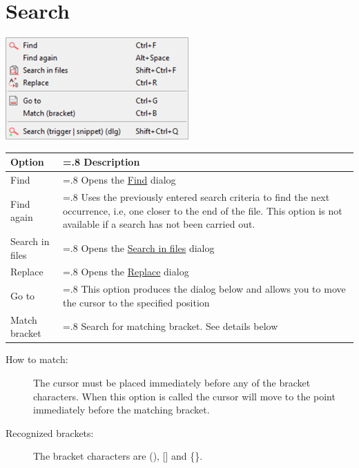 
\hypertarget{menu_search}{}
\section{Search}

\includegraphics[scale=0.50]{./res/menu_search.png}\\

\begin{scriptsize}
  \begin{tabularx}{\textwidth}{>{\hsize=0.2\hsize}X>{\hsize=.8\hsize}X}\\
    \hline
    \textbf{Option} & \textbf{Description} \\
    \hline
    Find & Opens the \href{\#working\_findreplace}{Find} dialog \\
    Find again & Uses the previously entered search criteria to find the next occurrence,
    i.e, one closer to the end of the file. This option is not available if a search has not been carried out. \\
    Search in files & Opens the \href{\#working\_searchinfiles}{Search in files} dialog \\
    Replace & Opens the \href{\#working\_findreplace}{Replace} dialog \\
    Go to & This option produces the dialog below and allows you to move the cursor to the specified position \\
    Match bracket & Search for matching bracket. See details below \\
    \hline
  \end{tabularx}
\end{scriptsize}

\begin{description}
  \item[How to match:]
    The cursor must be placed immediately before any of the bracket characters.  When this option is called the cursor will move to the point immediately before the matching bracket.

  \item[Recognized brackets:]
    The bracket characters are (), [] and \{\}.
\end{description}
